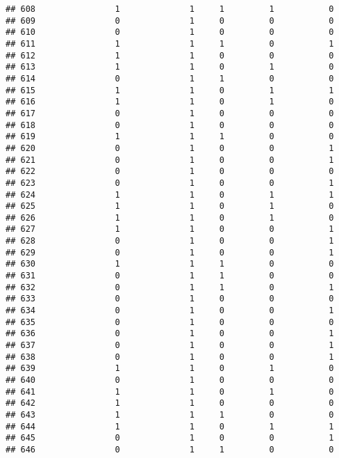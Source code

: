 \documentclass[]{article}
\begin{document}
\begin{verbatim}
## 608                1              1     1         1           0
## 609                0              1     0         0           0
## 610                0              1     0         0           0
## 611                1              1     1         0           1
## 612                1              1     0         0           0
## 613                1              1     0         1           0
## 614                0              1     1         0           0
## 615                1              1     0         1           1
## 616                1              1     0         1           0
## 617                0              1     0         0           0
## 618                0              1     0         0           0
## 619                1              1     1         0           0
## 620                0              1     0         0           1
## 621                0              1     0         0           1
## 622                0              1     0         0           0
## 623                0              1     0         0           1
## 624                1              1     0         1           1
## 625                1              1     0         1           0
## 626                1              1     0         1           0
## 627                1              1     0         0           1
## 628                0              1     0         0           1
## 629                0              1     0         0           1
## 630                1              1     1         0           0
## 631                0              1     1         0           0
## 632                0              1     1         0           1
## 633                0              1     0         0           0
## 634                0              1     0         0           1
## 635                0              1     0         0           0
## 636                0              1     0         0           1
## 637                0              1     0         0           1
## 638                0              1     0         0           1
## 639                1              1     0         1           0
## 640                0              1     0         0           0
## 641                1              1     0         1           0
## 642                1              1     0         0           0
## 643                1              1     1         0           0
## 644                1              1     0         1           1
## 645                0              1     0         0           1
## 646                0              1     1         0           0

\end{verbatim}
\end{document}
